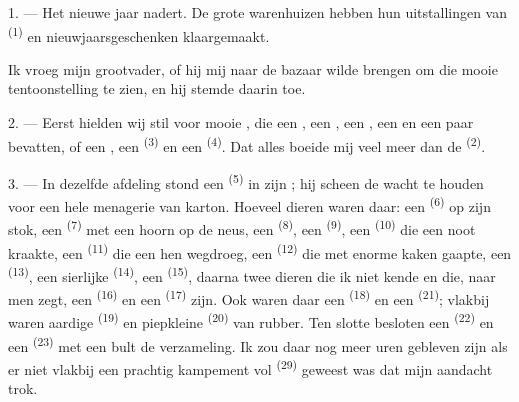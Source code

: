 %
%

\VUsaut{4.0mm}
\VUsaut{2.0mm}
\VUsaut{3.4mm}

1. --- Het nieuwe jaar nadert. De grote warenhuizen hebben hun uitstallingen van
 \textsuperscript{(1)} en nieuwjaarsgeschenken klaargemaakt.

Ik vroeg mijn grootvader, of hij mij naar de bazaar wilde brengen om die mooie tentoonstelling
te zien, en hij stemde daarin toe.

2. --- Eerst hielden wij stil voor mooie , die een
, een , een , een
 en een paar  bevatten, of een
, een  \textsuperscript{(3)} en een
 \textsuperscript{(4)}. Dat alles boeide mij veel meer dan de
 \textsuperscript{(2)}.

\VUsaut{3.0mm}
\VUsaut{2.6mm}

3. --- In dezelfde afdeling stond een  \textsuperscript{(5)} in zijn
; hij scheen de wacht te houden voor een hele menagerie van karton.
Hoeveel dieren waren daar: een
 \textsuperscript{(6)} op zijn stok, een 
\textsuperscript{(7)} met een hoorn op de neus, een  \textsuperscript{(8)},
een  \textsuperscript{(9)}, een
 \textsuperscript{(10)} die een noot kraakte, een 
\textsuperscript{(11)} die een hen wegdroeg, een  \textsuperscript{(12)} die
met enorme kaken gaapte, een  \textsuperscript{(13)}, een sierlijke
 \textsuperscript{(14)}, een  \textsuperscript{(15)}, daarna
twee dieren die ik niet kende en die, naar men zegt, een  \textsuperscript{(16)}
en een  \textsuperscript{(17)} zijn. Ook waren daar een 
\textsuperscript{(18)} en een  \textsuperscript{(21)}; vlakbij waren aardige
 \textsuperscript{(19)} en piepkleine  \textsuperscript{(20)}
van rubber. Ten slotte besloten een  \textsuperscript{(22)} en een
 \textsuperscript{(23)} met een bult de verzameling. Ik zou
daar nog meer uren gebleven zijn als er niet vlakbij een prachtig kampement vol
 \textsuperscript{(29)} geweest was dat mijn aandacht
trok.

